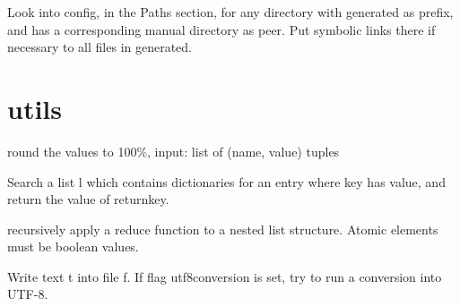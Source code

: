 \documentclass[a4paper,10pt,english]{sphinxmanual}
\begin{document}
\begin{fulllineitems}
\label{sourcecodedoc:ensureSymbolicLinks.createLinks}
Look into config, in the Paths section, for any directory
with generated as prefix, and has a corresponding manual directory as peer.
Put symbolic links there if necessary to all files in generated.

\end{fulllineitems}



\section{utils}
\label{sourcecodedoc:utils}\label{sourcecodedoc:module-utils}

\begin{fulllineitems}
\label{sourcecodedoc:utils.roundPie}
round the values to 100\%, input: list of (name, value) tuples

\end{fulllineitems}


\begin{fulllineitems}
\label{sourcecodedoc:utils.searchListOfDicts}
Search a list l which contains dictionaries for an entry
where key has value, and return the value of returnkey.

\end{fulllineitems}


\begin{fulllineitems}
\label{sourcecodedoc:utils.treeReduce}
recursively apply a reduce function to a nested list structure.
Atomic elements must be boolean values.

\end{fulllineitems}


\begin{fulllineitems}
\label{sourcecodedoc:utils.writefile}
Write text t into file f. If flag utf8conversion is set,
try to run a conversion into UTF-8.

\end{fulllineitems}
\end{document}
